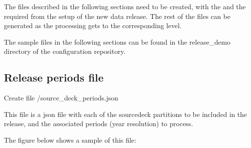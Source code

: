 \documentclass[letterpaper,10pt,english]{sphinxmanual}
\begin{document}
The files described in the following sections need to be created, with the
{\hyperref[\detokenize{index:release-periods-file}]{}} and the {\hyperref[\detokenize{index:process-list-file}]{}} required from the
setup of the new data release. The rest of the files can be generated as the
processing gets to the corresponding level.

The sample files in the following sections can be found in the release\_demo
directory of the configuration repository.


\subsection{Release periods file}
\label{\detokenize{index:release-periods-file}}\label{\detokenize{index:id1}}
Create file /source\_deck\_periods.json

This file is a json file with each of the source\sphinxhyphen{}deck partitions to be included
in the release, and the associated periods (year resolution) to process.

The figure below shows a sample of this file:

\begin{sphinxVerbatim}[commandchars=\\\{\}]
     
         
         
     
         
         
     
         
         
\end{sphinxVerbatim}
\end{document}
